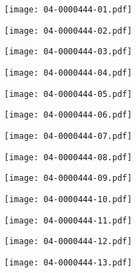 \documentclass[10pt,twocolumn,letterpaper]{article}
\begin{document}
\begin{figure*}[t]
\centering
 \begin{minipage}{0.058\textwidth} \centering \texttt{[image: 04-0000444-01.pdf]} \end{minipage}
 \begin{minipage}{0.058\textwidth} \centering \texttt{[image: 04-0000444-02.pdf]} \end{minipage}
 \begin{minipage}{0.058\textwidth} \centering \texttt{[image: 04-0000444-03.pdf]} \end{minipage}
 \begin{minipage}{0.058\textwidth} \centering \texttt{[image: 04-0000444-04.pdf]} \end{minipage}
 \begin{minipage}{0.058\textwidth} \centering \texttt{[image: 04-0000444-05.pdf]} \end{minipage}
 \begin{minipage}{0.058\textwidth} \centering \texttt{[image: 04-0000444-06.pdf]} \end{minipage}
 \begin{minipage}{0.058\textwidth} \centering \texttt{[image: 04-0000444-07.pdf]} \end{minipage}
 \begin{minipage}{0.058\textwidth} \centering \texttt{[image: 04-0000444-08.pdf]} \end{minipage}
 \begin{minipage}{0.058\textwidth} \centering \texttt{[image: 04-0000444-09.pdf]} \end{minipage}
 \begin{minipage}{0.058\textwidth} \centering \texttt{[image: 04-0000444-10.pdf]} \end{minipage}
 \begin{minipage}{0.058\textwidth} \centering \texttt{[image: 04-0000444-11.pdf]} \end{minipage}
 \begin{minipage}{0.058\textwidth} \centering \texttt{[image: 04-0000444-12.pdf]} \end{minipage}
 \begin{minipage}{0.058\textwidth} \centering \texttt{[image: 04-0000444-13.pdf]} \end{minipage}

\end{figure*}
\end{document}
